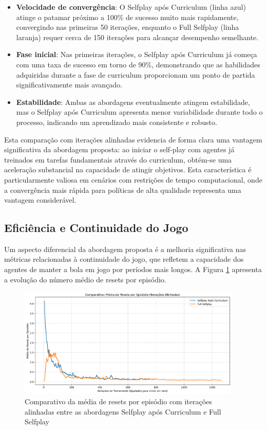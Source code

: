 \begin{itemize}
    \item \textbf{Velocidade de convergência}: O Selfplay após Curriculum (linha azul) atinge o patamar próximo a 100\% de sucesso muito mais rapidamente, convergindo nas primeiras 50 iterações, enquanto o Full Selfplay (linha laranja) requer cerca de 150 iterações para alcançar desempenho semelhante.
    
    \item \textbf{Fase inicial}: Nas primeiras iterações, o Selfplay após Curriculum já começa com uma taxa de sucesso em torno de 90\%, demonstrando que as habilidades adquiridas durante a fase de curriculum proporcionam um ponto de partida significativamente mais avançado.
    
    \item \textbf{Estabilidade}: Ambas as abordagens eventualmente atingem estabilidade, mas o Selfplay após Curriculum apresenta menor variabilidade durante todo o processo, indicando um aprendizado mais consistente e robusto.
\end{itemize}

Esta comparação com iterações alinhadas evidencia de forma clara uma vantagem significativa da abordagem proposta: ao iniciar o self-play com agentes já treinados em tarefas fundamentais através do curriculum, obtém-se uma aceleração substancial na capacidade de atingir objetivos. Esta característica é particularmente valiosa em cenários com restrições de tempo computacional, onde a convergência mais rápida para políticas de alta qualidade representa uma vantagem considerável.

\subsection{Eficiência e Continuidade do Jogo}

Um aspecto diferencial da abordagem proposta é a melhoria significativa nas métricas relacionadas à continuidade do jogo, que refletem a capacidade dos agentes de manter a bola em jogo por períodos mais longos. A Figura \ref{fig:total_resets} apresenta a evolução do número médio de resets por episódio.

\begin{figure}[H]
    \centering
    \includegraphics[width=0.95\textwidth]{fig/graficos_trabalho/graficos_experimentos/geral/comparativo_resets_episodio_alinhado.png}
    \caption{Comparativo da média de resets por episódio com iterações alinhadas entre as abordagens Selfplay após Curriculum e Full Selfplay}
    \label{fig:total_resets}
\end{figure}

